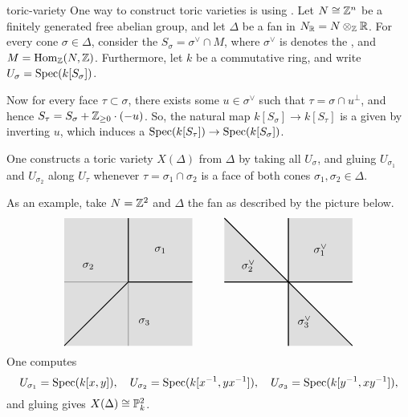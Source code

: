 \begin{example}{toric-variety}
    One way to construct toric varieties is using . Let $N \cong \mathbb{Z}^n$ be a finitely generated free abelian group, and let $\Delta$ be a fan in $N_{\mathbb{R}} = N \otimes_{\mathbb{Z}} \mathbb{R}$. For every cone $\sigma \in \Delta$, consider the  $S_\sigma = \sigma^\vee \cap M$, where $\sigma^\vee$ is denotes the , and $M = \operatorname{Hom}_{\mathbb{Z}}(N, \mathbb{Z})$. Furthermore, let $k$ be a commutative ring, and write $U_\sigma = \operatorname{Spec}(k[S_\sigma])$.
    
    Now for every face $\tau \subset \sigma$, there exists some $u \in \sigma^\vee$ such that $\tau = \sigma \cap u^\perp$, and hence $S_\tau = S_\sigma + \mathbb{Z}_{\ge 0} \cdot (-u)$. So, the natural map $k[S_\sigma] \to k[S_\tau]$ is a  given by inverting $u$, which induces a  $\operatorname{Spec}(k[S_\tau]) \to \operatorname{Spec}(k[S_\sigma])$.
    
    One constructs a toric variety $X(\Delta)$ from $\Delta$ by taking all $U_\sigma$, and gluing $U_{\sigma_1}$ and $U_{\sigma_2}$ along $U_\tau$ whenever $\tau = \sigma_1 \cap \sigma_2$ is a face of both cones $\sigma_1, \sigma_2 \in \Delta$.
    
    As an example, take $N = \mathbb{Z}^2$ and $\Delta$ the fan as described by the picture below.
    \[ \begin{tikzpicture}
        \begin{scope}
            \draw (-2, 0) -- (2, 0);
            \draw (0, -2) -- (0, 2);
            \fill[fill=gray!50, opacity=0.5] (-2, -2) -- (2, -2) -- (2, 2) -- (-2, 2);
            \draw[thick] (0, 0) -- (2, 0);
            \draw[thick] (0, 0) -- (0, 2);
            \draw[thick] (0, 0) -- (-2, -2);
            \node at (1, 1) {$\sigma_1$};
            \node at (-1.25, 0.5) {$\sigma_2$};
            \node at (0.5, -1.25) {$\sigma_3$};
        \end{scope}
        \begin{scope}[shift={(5, 0)}]
            \draw (-2, 0) -- (2, 0);
            \draw (0, -2) -- (0, 2);
            \fill[fill=gray!50, opacity=0.5] (0, 0) -- (2, 0) -- (2, 2) -- (0, 2);
            \fill[fill=gray!50, opacity=0.5] (0, 0) -- (-2, 0) -- (-2, 2);
            \fill[fill=gray!50, opacity=0.5] (0, 0) -- (0, -2) -- (2, -2);
            \draw[thick] (-2, 0) -- (2, 0);
            \draw[thick] (0, -2) -- (0, 2);
            \draw[thick] (-2, 2) -- (2, -2);
            \node at (1, 1) {$\sigma_1^\vee$};
            \node at (-1.25, 0.5) {$\sigma_2^\vee$};
            \node at (0.5, -1.25) {$\sigma_3^\vee$};
        \end{scope}
    \end{tikzpicture} \]
    One computes
    \[ U_{\sigma_1} = \operatorname{Spec}(k[x, y]), \quad U_{\sigma_2} = \operatorname{Spec}(k[x^{-1}, yx^{-1}]), \quad U_{\sigma_3} = \operatorname{Spec}(k[y^{-1}, xy^{-1}]) , \]
    and gluing gives $X(\Delta) \cong \mathbb{P}_k^2$.    
\end{example}

